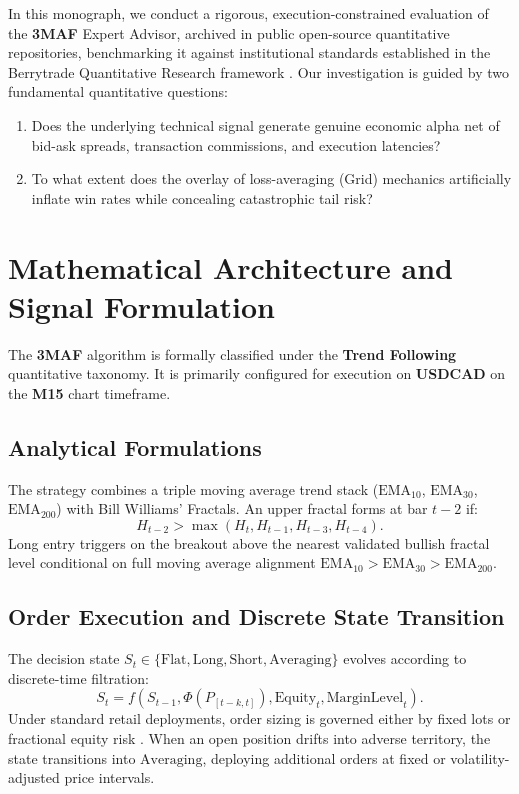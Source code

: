 \documentclass[11pt,a4paper]{article}
\begin{document}
In this monograph, we conduct a rigorous, execution-constrained evaluation of the \textbf{3MAF} Expert Advisor, archived in public open-source quantitative repositories, benchmarking it against institutional standards established in the Berrytrade Quantitative Research framework \cite{artsu2026illusion}. Our investigation is guided by two fundamental quantitative questions:
\begin{enumerate}
    \item Does the underlying technical signal generate genuine economic alpha net of bid-ask spreads, transaction commissions, and execution latencies?
    \item To what extent does the overlay of loss-averaging (Grid) mechanics artificially inflate win rates while concealing catastrophic tail risk?
\end{enumerate}

\section{Mathematical Architecture and Signal Formulation}
The \textbf{3MAF} algorithm is formally classified under the \textbf{Trend Following} quantitative taxonomy. It is primarily configured for execution on \textbf{USDCAD} on the \textbf{M15} chart timeframe.

\subsection{Analytical Formulations}

The strategy combines a triple moving average trend stack ($\text{EMA}_{10}$, $\text{EMA}_{30}$, $\text{EMA}_{200}$) with Bill Williams' Fractals.
An upper fractal forms at bar $t-2$ if:
\begin{equation}
H_{t-2} > \max(H_{t}, H_{t-1}, H_{t-3}, H_{t-4}).
\end{equation}
Long entry triggers on the breakout above the nearest validated bullish fractal level conditional on full moving average alignment $\text{EMA}_{10} > \text{EMA}_{30} > \text{EMA}_{200}$.


\subsection{Order Execution and Discrete State Transition}
The decision state $S_t \in \{\text{Flat}, \text{Long}, \text{Short}, \text{Averaging}\}$ evolves according to discrete-time filtration:
\begin{equation}
S_{t} = f(S_{t-1}, \Phi(P_{[t-k, t]}), \text{Equity}_t, \text{MarginLevel}_t).
\end{equation}
Under standard retail deployments, order sizing is governed either by fixed lots or fractional equity risk \cite{lopez2018advances, carhart1997persistence}. When an open position drifts into adverse territory, the state transitions into $\text{Averaging}$, deploying additional orders at fixed or volatility-adjusted price intervals.
\end{document}
